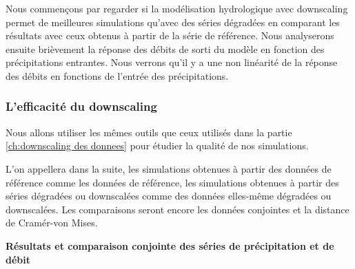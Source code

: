 \documentclass[a4paper,11pt]{article}
\numberwithin{equation}{section}
\begin{document}
Nous commençons par regarder si la modélisation hydrologique avec downscaling permet de meilleures simulations qu'avec des séries dégradées en comparant les résultats avec ceux obtenus à partir de la série de référence. Nous analyserons ensuite brièvement la réponse des débits de sorti du modèle en fonction des précipitations entrantes. Nous verrons qu'il y a une non linéarité de la réponse des débits en fonctions de l'entrée des précipitations.
 
\subsubsection{L'efficacité du downscaling}

Nous allons utiliser les mêmes outils que ceux utilisés dans la partie \ref{ch:downscaling des donnees} pour étudier la qualité de nos simulations.

L'on appellera dans la suite, les simulations obtenues à partir des données de référence comme les données de référence, les simulations obtenues à partir des séries dégradées ou downscalées comme des données elles-même dégradées ou downscalées. Les comparaisons seront encore les données conjointes et la distance de Cramér-von Mises.

\vspace{0.7 cm}

\noindent\textbf{Résultats et comparaison conjointe des séries de précipitation et de débit}
\end{document}
